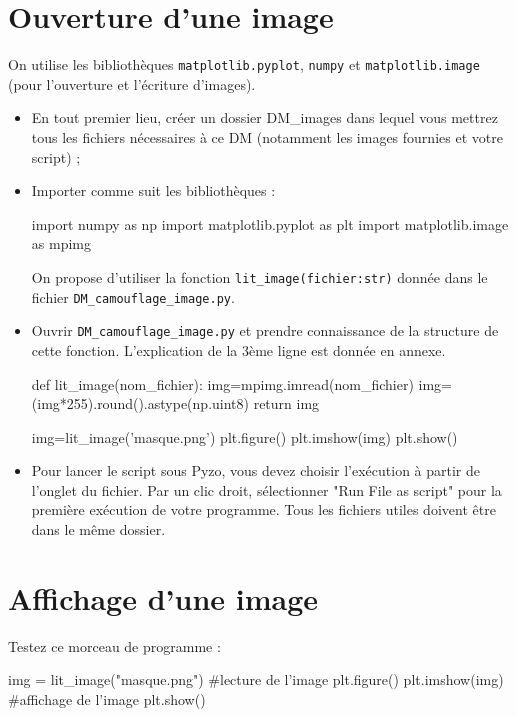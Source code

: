 \documentclass[10pt]{article}
\begin{document}
\section{Ouverture d'une image}
On utilise les bibliothèques \texttt{matplotlib.pyplot}, \texttt{numpy} et  \texttt{matplotlib.image} (pour l’ouverture et l’écriture d’images).
\begin{itemize}
\item En tout premier lieu, créer un dossier DM\_images dans lequel vous mettrez tous les fichiers nécessaires à ce DM (notamment les images fournies et votre script) ;
\item Importer comme suit les bibliothèques :
\begin{python}
import numpy as np
import matplotlib.pyplot as plt
import matplotlib.image as mpimg
\end{python}
On propose d’utiliser la fonction \texttt{lit\_image(fichier:str)} donnée dans le fichier \texttt{DM\_camouflage\_image.py}.
\item Ouvrir \texttt{DM\_camouflage\_image.py} et prendre connaissance de la structure de cette fonction. L'explication de la 3ème ligne est donnée en annexe.
\begin{python}
def lit_image(nom_fichier):
    img=mpimg.imread(nom_fichier)
    img=(img*255).round().astype(np.uint8)
    return img
    
img=lit_image('masque.png')
plt.figure()
plt.imshow(img)
plt.show()
\end{python}
\item Pour lancer le script sous Pyzo, vous devez choisir l'exécution à partir de l'onglet du fichier. Par un clic droit, sélectionner "Run File as script" pour la première exécution de votre programme. Tous les fichiers utiles doivent être dans le même dossier.
\end{itemize}


\section{Affichage d'une image}

Testez ce morceau de programme :
\begin{python}
img = lit_image("masque.png")  #lecture de l'image
plt.figure()
plt.imshow(img)  #affichage de l'image
plt.show()
\end{python}
\end{document}
